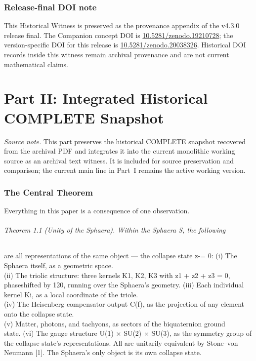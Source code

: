 \documentclass[12pt,a4paper]{article}
\begin{document}
\section*{Release-final DOI note}
\label{sec:historical-release-final-doi-note}

This Historical Witness is preserved as the provenance appendix of the v4.3.0 release final.  The Companion concept DOI is \href{https://doi.org/10.5281/zenodo.19210728}{10.5281/zenodo.19210728}; the version-specific DOI for this release is \href{https://doi.org/10.5281/zenodo.20038326}{10.5281/zenodo.20038326}. Historical DOI records inside this witness remain archival provenance and are not current mathematical claims.

\clearpage
\part*{Part II: Integrated Historical COMPLETE Snapshot}

\begin{center}
\textit{Source note.} This part preserves the historical COMPLETE snapshot recovered from the archival PDF and integrates it into the current monolithic working source as an archival text witness. It is included for source preservation and comparison; the current main line in Part~I remains the active working version.
\end{center}

\section{The Central Theorem}
Everything in this paper is a consequence of one observation.
\paragraph*{Theorem 1.1 (Unity of the Sphaera). Within the Sphaera S, the following}
are all representations of the same object --- the collapse state z-= 0:
(i) The Sphaera itself, as a geometric space.\\
(ii) The triolic structure: three kernels K1, K2, K3 with z1 + z2 + z3 = 0,\\
phaseshifted by 120, running over the Sphaera's geometry.
(iii) Each individual kernel Ki, as a local coordinate of the triole.\\
(iv) The Heisenberg compensator output C(f), as the projection of any element onto the collapse state.\\
(v) Matter, photons, and tachyons, as sectors of the biquaternion ground\\
state.
(vi) The gauge structure U(1) $\times$ SU(2) $\times$ SU(3), as the symmetry group of\\
the collapse state's representations. All are unitarily equivalent by Stone--von Neumann [1]. The Sphaera's only object is its own collapse state.
\end{document}
